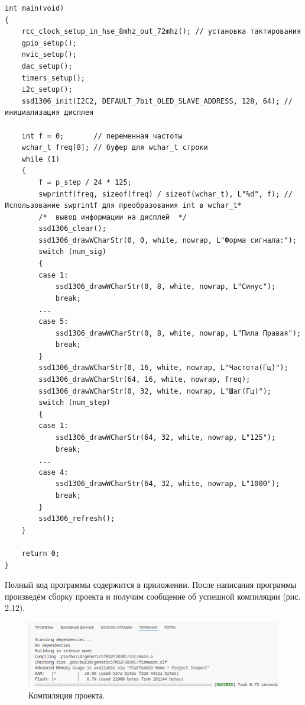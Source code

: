 \begin{code}
\begin{verbatim}
int main(void)
{
    rcc_clock_setup_in_hse_8mhz_out_72mhz(); // установка тактирования
    gpio_setup();
    nvic_setup();
    dac_setup();
    timers_setup();
    i2c_setup();
    ssd1306_init(I2C2, DEFAULT_7bit_OLED_SLAVE_ADDRESS, 128, 64); // инициализация дисплея

    int f = 0;       // переменная частоты
    wchar_t freq[8]; // буфер для wchar_t строки
    while (1)
    {
        f = p_step / 24 * 125;
        swprintf(freq, sizeof(freq) / sizeof(wchar_t), L"%d", f); // Использование swprintf для преобразования int в wchar_t*
        /*  вывод информации на дисплей  */
        ssd1306_clear();
        ssd1306_drawWCharStr(0, 0, white, nowrap, L"Форма сигнала:");
        switch (num_sig)
        {
        case 1:
            ssd1306_drawWCharStr(0, 8, white, nowrap, L"Синус");
            break;
       	...
        case 5:
            ssd1306_drawWCharStr(0, 8, white, nowrap, L"Пила Правая");
            break;
        }
        ssd1306_drawWCharStr(0, 16, white, nowrap, L"Частота(Гц)");
        ssd1306_drawWCharStr(64, 16, white, nowrap, freq);
        ssd1306_drawWCharStr(0, 32, white, nowrap, L"Шаг(Гц)");
        switch (num_step)
        {
        case 1:
            ssd1306_drawWCharStr(64, 32, white, nowrap, L"125");
            break;
        ...
        case 4:
            ssd1306_drawWCharStr(64, 32, white, nowrap, L"1000");
            break;
        }
        ssd1306_refresh();
    }

    return 0;
}
\end{verbatim}
\end{code}
	
	Полный код программы содержится в приложении. После написания программы произведём сборку проекта и получим сообщение об успешной компиляции (рис. 2.12).
	
	\begin{figure}[H]
    \centering
    \includegraphics[width=1\textwidth]{../image/compile.png}
    \caption{Компиляция проекта.}
	\end{figure}
	
